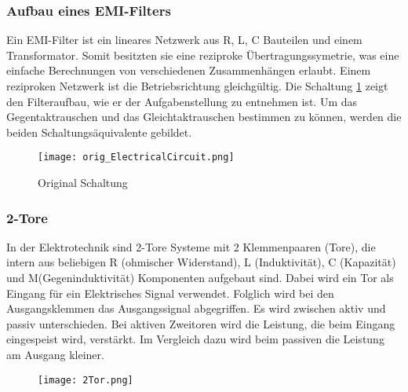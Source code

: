 \subsubsection{Aufbau eines EMI-Filters} \label{subsubsec:emi_filter}
Ein EMI-Filter ist ein lineares Netzwerk aus R, L, C Bauteilen und einem Transformator. Somit besitzten sie eine reziproke Übertragungssymetrie, was eine einfache Berechnungen von verschiedenen Zusammenhängen erlaubt. Einem reziproken Netzwerk ist die Betriebsrichtung gleichgültig.
Die Schaltung \ref{fig:orig_Schaltung}  zeigt den Filteraufbau, wie er der Aufgabenstellung zu entnehmen ist. Um das Gegentaktrauschen und das Gleichtaktrauschen bestimmen zu können, werden die beiden Schaltungsäquivalente gebildet. 

\begin{figure}[H]
	\centering
	\texttt{[image: orig\_ElectricalCircuit.png]}
	\caption{Original Schaltung \cite{aufgabenstellung}}
	\label{fig:orig_Schaltung}
\end{figure}


\subsubsection{2-Tore} \label{subsubsec:emi_filter}

In der Elektrotechnik sind 2-Tore Systeme mit 2 Klemmenpaaren (Tore), die intern aus beliebigen
R (ohmischer Widerstand), L (Induktivität), C (Kapazität) und M(Gegeninduktivität) Komponenten aufgebaut sind. 
Dabei wird ein Tor als Eingang für ein Elektrisches Signal verwendet. Folglich wird bei den Ausgangsklemmen das Ausgangssignal abgegriffen. 
Es wird zwischen aktiv und passiv unterschieden.
Bei aktiven Zweitoren wird die Leistung, die beim Eingang eingespeist wird, verstärkt. 
Im Vergleich dazu wird beim passiven die Leistung am Ausgang kleiner.

\begin{figure}[H]
	\centering
	\texttt{[image: 2Tor.png]}
	\label{fig:übersicht}
\end{figure}